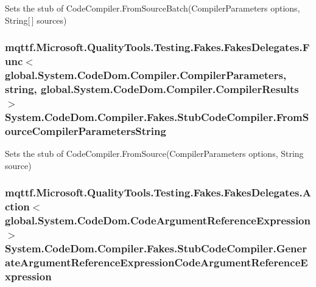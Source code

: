 Sets the stub of Code\-Compiler.\-From\-Source\-Batch(\-Compiler\-Parameters options, String\mbox{[}$\,$\mbox{]} sources)

\hypertarget{class_system_1_1_code_dom_1_1_compiler_1_1_fakes_1_1_stub_code_compiler_aed00ae47ba33358aee75a5f2a556e50c}{
\subsubsection[{From\-Source\-Compiler\-Parameters\-String}]{\setlength{\rightskip}{0pt plus 5cm}mqttf.\-Microsoft.\-Quality\-Tools.\-Testing.\-Fakes.\-Fakes\-Delegates.\-Func$<$global.\-System.\-Code\-Dom.\-Compiler.\-Compiler\-Parameters, string, global.\-System.\-Code\-Dom.\-Compiler.\-Compiler\-Results$>$ System.\-Code\-Dom.\-Compiler.\-Fakes.\-Stub\-Code\-Compiler.\-From\-Source\-Compiler\-Parameters\-String}}\label{class_system_1_1_code_dom_1_1_compiler_1_1_fakes_1_1_stub_code_compiler_aed00ae47ba33358aee75a5f2a556e50c}


Sets the stub of Code\-Compiler.\-From\-Source(\-Compiler\-Parameters options, String source)

\hypertarget{class_system_1_1_code_dom_1_1_compiler_1_1_fakes_1_1_stub_code_compiler_a75670e593c38fce395b3d4870e219a11}{
\subsubsection[{Generate\-Argument\-Reference\-Expression\-Code\-Argument\-Reference\-Expression}]{\setlength{\rightskip}{0pt plus 5cm}mqttf.\-Microsoft.\-Quality\-Tools.\-Testing.\-Fakes.\-Fakes\-Delegates.\-Action$<$global.\-System.\-Code\-Dom.\-Code\-Argument\-Reference\-Expression$>$ System.\-Code\-Dom.\-Compiler.\-Fakes.\-Stub\-Code\-Compiler.\-Generate\-Argument\-Reference\-Expression\-Code\-Argument\-Reference\-Expression}}\label{class_system_1_1_code_dom_1_1_compiler_1_1_fakes_1_1_stub_code_compiler_a75670e593c38fce395b3d4870e219a11}


